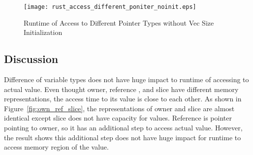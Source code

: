 \begin{figure}[htb]
    \texttt{[image: rust\_access\_different\_poniter\_noinit.eps]}
    \caption{Runtime of Access to Different Pointer Types without Vec Size Initialization}
    \label{fig:rustaccessnoinit}
\end{figure}



\subsection{Discussion}
\label{sec:history}
Difference of variable types does not have huge impact to runtime of accessing to actual value.
Even thought owner, reference , and slice have different memory representations, the access time to its value is 
close to each other. As shown in Figure~\ref{fig:own_ref_slice}, the representations of owner and slice are almost identical except slice does not have capacity for values.
Reference is pointer pointing to owner, so it has an additional step to access actual value. 
However, the result shows this additional step does not have huge impact for runtime to access memory region of the value.


